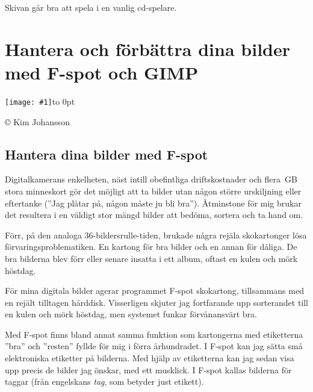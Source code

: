 \documentclass[a4paper,final]{memoir} %
\newcommand{\xrcredit}[1]{\hbox to 0pt{\hspace*{.6\baselineskip}\begin{rotate}{90}{\usefont{T1}{phv}{m}{n}\selectfont\tiny #1}\end{rotate}}}
\newcommand\xintropic[1]{{\texttt{[image: \#1]}\xrcredit{\copyright{} Kim Johansson}}\medskip}
\newcommand\xchapter[2]{\chapter{#2}\begin{center}\xintropic{#1}\end{center}}
\begin{document}

Skivan går bra att spela i en vanlig cd-spelare.



\xchapter{bilder804-all/Hanter_dina_bilder_med_fspot}{Hantera och förbättra dina bilder med F-spot och GIMP}\label{cha:foto}



\section{Hantera dina bilder med F-spot}

Digitalkamerans enkelheten, näst intill obefintliga driftskostnader och flera~GB stora minneskort gör det möjligt att ta bilder utan någon större urskiljning eller eftertanke (''Jag plåtar på, någon måste ju bli bra''). Åtminstone för mig brukar det resultera i en väldigt stor mängd bilder att bedöma, sortera och ta hand om.

Förr, på den analoga 36-bildersrulle-tiden, brukade några rejäla skokartonger lösa förvaringsproblematiken. En kartong för bra bilder och en annan för dåliga. De bra bilderna blev förr eller senare insatta i ett album, oftast en kulen och mörk höstdag. 

För mina digitala bilder agerar programmet F-spot skokartong, tillsammans med en rejält tilltagen hårddisk. Visserligen skjuter jag fortfarande upp sorterandet till en kulen och mörk höstdag, men systemet funkar förvånansvärt bra.

Med F-spot finns bland annat samma funktion som kartongerna med etiketterna ''bra'' och ''resten'' fyllde för mig i förra århundradet. I F-spot kan jag sätta små elektroniska etiketter på bilderna. Med hjälp av etiketterna kan jag sedan visa upp precis de bilder jag önskar, med ett musklick. I F-spot kallas bilderna för taggar (från engelskans \textit{tag}, som betyder just etikett). 

\end{document}
